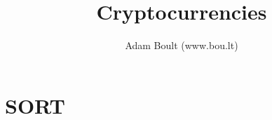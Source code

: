\documentclass[oneside]{book}
\begin{document}
\author{Adam Boult (www.bou.lt)}
\title{Cryptocurrencies}
\maketitle

\setcounter{tocdepth}{0}
\tableofcontents



\part{SORT}

\end{document}
